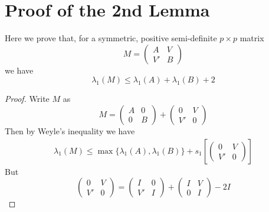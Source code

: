 \documentclass{article}
\begin{document}
\section{Proof of the 2nd Lemma}
Here we prove that, for a symmetric, positive semi-definite $p \times
p$ matrix
\[
M =
\begin{pmatrix}
  A & V \\
  V' & B
\end{pmatrix}
\]
we have
\[
\lambda_1(M) \leq \lambda_1(A) + \lambda_1(B) + 2
\]
\begin{proof}
  Write $M$ as
  \[
  M =
  \begin{pmatrix}
    A & 0 \\
    0 & B
  \end{pmatrix} +
  \begin{pmatrix}
    0 & V \\
    V' & 0
  \end{pmatrix}
  \]
  Then by Weyle's inequality we have
  \begin{eqnarray*}
    \lambda_1(M) \leq \max\{\lambda_1(A), \lambda_1(B)\} +
    s_1\left[\left(
      \begin{array}{cc}
        0 & V \\
        V' & 0
      \end{array}
      \right)\right]
  \end{eqnarray*}
  But
  \[
  \begin{pmatrix}
    0 & V \\
    V' & 0
  \end{pmatrix} =
  \begin{pmatrix}
    I & 0 \\
    V' & I
  \end{pmatrix} +
  \begin{pmatrix}
    I & V \\
    0 & I
  \end{pmatrix} - 2I
  \]
\end{proof}


\end{document}
